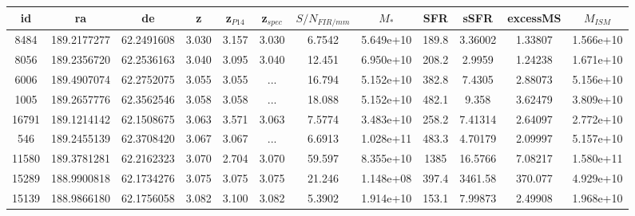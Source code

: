 \begin{table*}
  \centering
  \small
  \begin{tabular}{cccccccccccc}
  \hline
  \hline
             id &              ra &              de &               z &       z$_{P14}$ &      z$_{spec}$ &  $S/N_{FIR/mm}$ &         $M_{*}$ &             SFR &            sSFR &        excessMS &       $M_{ISM}$ \\
  \hline
           8484 &     189.2177277 &      62.2491608 &           3.030 &           3.157 &           3.030 &          6.7542 &       5.649e+10 &           189.8 &         3.36002 &         1.33807 &       1.566e+10 \\
           8056 &     189.2356720 &      62.2536163 &           3.040 &           3.095 &           3.040 &          12.451 &       6.950e+10 &           208.2 &          2.9959 &         1.24238 &       1.671e+10 \\
           6006 &     189.4907074 &      62.2752075 &           3.055 &           3.055 &             ... &          16.794 &       5.152e+10 &           382.8 &          7.4305 &         2.88073 &       5.156e+10 \\
           1005 &     189.2657776 &      62.3562546 &           3.058 &           3.058 &             ... &          18.088 &       5.152e+10 &           482.1 &           9.358 &         3.62479 &       3.809e+10 \\
          16791 &     189.1214142 &      62.1508675 &           3.063 &           3.571 &           3.063 &          7.5774 &       3.483e+10 &           258.2 &         7.41314 &         2.64097 &       2.772e+10 \\
            546 &     189.2455139 &      62.3708420 &           3.067 &           3.067 &             ... &          6.6913 &       1.028e+11 &           483.3 &         4.70179 &         2.09997 &       5.157e+10 \\
          11580 &     189.3781281 &      62.2162323 &           3.070 &           2.704 &           3.070 &          59.597 &       8.355e+10 &            1385 &         16.5766 &         7.08217 &       1.580e+11 \\
          15289 &     188.9900818 &      62.1734276 &           3.075 &           3.075 &           3.075 &          21.246 &       1.148e+08 &           397.4 &         3461.58 &         370.077 &       4.929e+10 \\
          15139 &     188.9866180 &      62.1756058 &           3.082 &           3.100 &           3.082 &          5.3902 &       1.914e+10 &           153.1 &         7.99873 &         2.49908 &       1.968e+10 \\

\end{tabular}
\end{table*}
